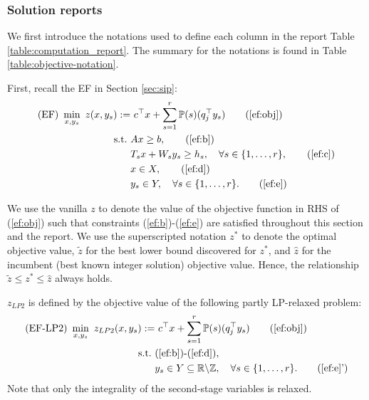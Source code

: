 \subsubsection{Solution reports}
We first introduce the notations used to define each column in the report Table \ref{table:computation_report}. The summary for the notations is found in Table \ref{table:objective-notation}.

First, recall the EF in Section \ref{sec:sip}:
\begin{subequations}\label{ef}
	\begin{align}
	\textrm{(EF) }\min_{x,y_s}\ z(x,y_s):=&\ c^{\top}x + \sum_{s=1}^{r}\PP(s) (q_j^{\top}y_s) \tag{\ref{ef:obj}}\\ 
	\mathrm{s.t.}\ &Ax\ge b,  \tag{\ref{ef:b}}\\
	&T_s x+W_s y_s\ge h_s,\quad\forall s\in\{1,\ldots,r\}, \tag{\ref{ef:c}} \\
	&x\in X, \tag{\ref{ef:d}} \\
	&y_s \in Y,\quad\forall s\in\{1,\ldots,r\}. \tag{\ref{ef:e}}
	\end{align}
\end{subequations}

We use the vanilla $z$ to denote the value of the objective function in RHS of (\ref{ef:obj}) such that constraints (\ref{ef:b})-(\ref{ef:e}) are satisfied throughout this section and the report. We use the superscripted notation $z^*$ to denote the optimal objective value, $\tilde{z}$ for the best lower bound discovered for $z^*$, and $\hat{z}$ for the incumbent (best known integer solution) objective value. Hence, the relationship $\tilde{z}\le z^*\le\hat{z}$ always holds.

$z_{LP2}$ is defined by the objective value of the following partly LP-relaxed problem:
\begin{subequations}\label{ef-lp2}
	\begin{align}
	\textrm{(EF-LP2) }\min_{x,y_s}\ z_{LP2}(x,y_s):=&\ c^{\top}x + \sum_{s=1}^{r}\PP(s) (q_j^{\top}y_s) \tag{\ref{ef:obj}}\\ 
	\mathrm{s.t.}\ &\textrm{(\ref{ef:b})-(\ref{ef:d})}, \nonumber \\
	& y_s \in Y \subseteq \mathbb{R}\backslash\mathbb{Z} ,\quad\forall s\in\{1,\ldots,r\}. \tag{\ref{ef:e}'}
	\end{align}
\end{subequations}
Note that only the integrality of the second-stage variables is relaxed.

